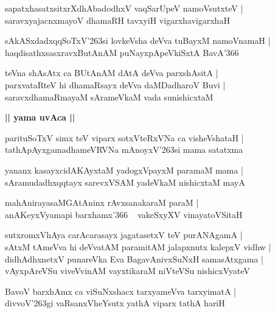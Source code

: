 \documentclass[twoside,12pt,openright]{book}
\def\S{\char'263}
\newcounter{shloka}[chapter]
\def\uvaca#1{\centerline{{\large\textbf{#1}}}}
\begin{document}
\begin{shloka}%
sapatxhasatxsitxrXdhAbadodhxV vaqSarUpeV namoVsutxteV |\\
saravxyajacnxmayoV dhamaRH tavxyiH vigarxhavigarxhaH
\end{shloka}

\begin{shloka}%
sAkASxdadxqqSoTxV\S si lovkeVsha deVva tuBayxM namoVnamaH |\\
haqdisathxsasxravxButAnAM puNayxpApeVkiSxtA BavA\char'366
\end{shloka}

\begin{shloka}%
teVna shAsAtx ca BUtAnAM  dAtA deVva parxshAsitA |\\
parxvataRteV hi dhamaRsayx deVva daMDadharoV Buvi |\\
saravxdhamaRmayaM sArameVkaM vada sunishicxtaM
\end{shloka}

\uvaca{|| yama uvAca ||}

\begin{shloka}%
parituSoTxV simx teV viparx sotxVteRxVNa ca visheVshataH |\\
tathApAyxgamadhameVRVNa mAnoyxV\S si mama satatxma
\end{shloka}

\begin{shloka}%
yananx kasayxcidAKAyxtaM yadogxVpayxM paramaM mama |\\
sAramudadhxqqtayx sarevxVSAM yadeVkaM nishicxtaM mayA 
\end{shloka}

\begin{shloka}%
mahAnirayasaMGAtAninx rAvxsanakaraM paraM |\\
anAKeyxVyamapi barxhamx\char'366 ~ vakeSxyXV vinayatoVSitaH 
\end{shloka}

\begin{shloka}%
sutxromxVhAya carAcarasayx jagatasetxV teV purANAgamA |\\
sAtxM tAmeVva hi deVvatAM paramitAM jalapxnutx kalepxV vidhw |\\
didhAdhxnetxV punareVka Eva BagavAnivxSuNxH samasAtxgama |\\
vAyxpAreVSu viveVvinAM vayxtikaraM niVteVSu nishicxVyateV 
\end{shloka}

\begin{shloka}%
BavoV barxhAmx ca viSuNxshacx tarxyameVva tarxyimatA |\\
divvoV\S gi vaRsanxVheYsutx yathA viparx tathA hariH
\end{shloka}
\end{document}
